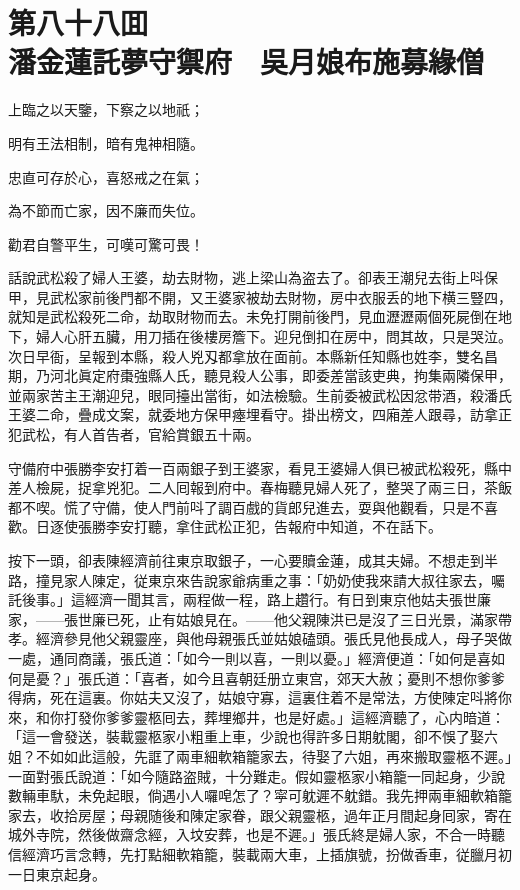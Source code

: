 
\chapter*{第八十八囬　\\潘金蓮託夢守禦府　吳月娘布施募緣僧}


\begin{myquote}
上臨之以天鑒，下察之以地祇；

明有王法相制，暗有鬼神相隨。

忠直可存於心，喜怒戒之在氣；

為不節而亡家，因不廉而失位。

勸君自警平生，可嘆可驚可畏！
\end{myquote}

話說武松殺了婦人王婆，劫去財物，逃上梁山為盗去了。卻表王潮兒去街上呌保甲，見武松家前後門都不開，又王婆家被劫去財物，房中衣服丢的地下横三豎四，就知是武松殺死二命，劫取財物而去。未免打開前後門，見血瀝瀝兩個死屍倒在地下，婦人心肝五臟，用刀插在後樓房簷下。迎兒倒扣在房中，問其故，只是哭泣。次日早衙，呈報到本縣，殺人兇刄都拿放在面前。本縣新任知縣也姓李，雙名昌期，乃河北眞定府棗強縣人氏，聽見殺人公事，即委差當該吏典，拘集兩隣保甲，並兩家苦主王潮迎兒，眼同擡出當街，如法檢驗。生前委被武松因忿带酒，殺潘氏王婆二命，疊成文案，就委地方保甲瘞埋看守。掛出榜文，四廂差人跟尋，訪拿正犯武松，有人首告者，官給賞銀五十兩。

守備府中張勝李安打着一百兩銀子到王婆家，看見王婆婦人俱已被武松殺死，縣中差人檢屍，捉拿兇犯。二人囘報到府中。春梅聽見婦人死了，整哭了兩三日，茶飯都不喫。慌了守備，使人門前呌了調百戲的貨郎兒進去，耍與他觀看，只是不喜歡。日逐使張勝李安打聽，拿住武松正犯，告報府中知道，不在話下。

按下一頭，卻表陳經濟前往東京取銀子，一心要贖金蓮，成其夫婦。不想走到半路，撞見家人陳定，従東京來告說家爺病重之事：「奶奶使我來請大叔往家去，囑託後事。」這經濟一聞其言，兩程做一程，路上趲行。有日到東京他姑夫張世廉家，——張世廉已死，止有姑娘見在。——他父親陳洪已是沒了三日光景，滿家帶孝。經濟參見他父親靈座，與他母親張氏並姑娘磕頭。張氏見他長成人，母子哭做一處，通同商議，張氏道：「如今一則以喜，一則以憂。」經濟便道：「如何是喜如何是憂？」張氏道：「喜者，如今且喜朝廷册立東宫，郊天大赦；憂則不想你爹爹得病，死在這裏。你姑夫又沒了，姑娘守寡，這裏住着不是常法，方使陳定呌將你來，和你打發你爹爹靈柩囘去，葬埋鄉井，也是好處。」這經濟聽了，心内暗道：「這一會發送，裝載靈柩家小粗重上車，少說也得許多日期躭閣，卻不悞了娶六姐？不如如此這般，先誆了兩車細軟箱籠家去，待娶了六姐，再來搬取靈柩不遲。」一面對張氏說道：「如今隨路盗賊，十分難走。假如靈柩家小箱籠一同起身，少說數輛車馱，未免起眼，倘遇小人囉唣怎了？寜可躭遲不躭錯。我先押兩車細軟箱籠家去，收拾房屋；母親随後和陳定家眷，跟父親靈柩，過年正月間起身囘家，寄在城外寺院，然後做齋念經，入坟安葬，也是不遲。」張氏終是婦人家，不合一時聽信經濟巧言念轉，先打點細軟箱籠，裝載兩大車，上插旗號，扮做香車，従臘月初一日東京起身。

